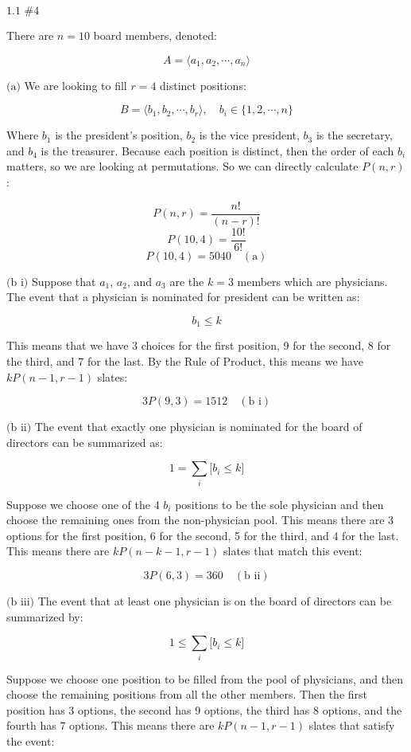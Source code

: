 \documentclass{article}
\newcommand{\problem}[2]{$\boxed{\text{#1 \##2}}$}
\newcommand{\subproblem}[1]{$\boxed{\text{(#1)}}$}
\newcommand{\subsolution}[2]{\boxed{#2\quad(\text{#1})}}
\newcommand{\ROP}{Rule of Product}
\begin{document}
\begin{multicols*}{2}

%
\problem{1.1}{4}

There are $n=10$ board members, denoted:

\[
A=\langle{}a_1,a_2,\cdots,a_n\rangle
\]

%
\subproblem{a} We are looking to fill $r=4$ distinct positions:

\[
B=\langle{}b_1,b_2,\cdots,b_r\rangle, \quad b_i\in\{1,2,\cdots,n\}
\]

Where $b_1$ is the president's position, $b_2$ is the vice president,
$b_3$ is the secretary, and $b_4$ is the treasurer. Because each
position is distinct, then the order of each $b_i$ matters, so we are
looking at permutations. So we can directly calculate $P(n,r)$:

\[
P(n,r)=\frac{n!}{(n-r)!}
\] \[
P(10, 4)=\frac{10!}{6!}
\] \[
\subsolution{a}{P(10, 4)=5040}
\]

%
\subproblem{b i} Suppose that $a_1$, $a_2$, and $a_3$ are the $k=3$
members which are physicians. The event that a physician is nominated
for president can be written as:

\[
b_1\le k
\]

This means that we have 3 choices for the first position, 9 for the
second, 8 for the third, and 7 for the last. By the \ROP, this means
we have $kP(n-1,r-1)$ slates:

\[
\subsolution{b i}{3P(9,3)=1512}
\]

%
\subproblem{b ii} The event that exactly one physician is nominated
for the board of directors can be summarized as:

\[
1=\sum\limits_i \lbrack b_i\le k\rbrack
\]

Suppose we choose one of the 4 $b_i$ positions to be the sole
physician and then choose the remaining ones from the non-physician
pool. This means there are 3 options for the first position, 6 for the
second, 5 for the third, and 4 for the last. This means there are
$kP(n-k-1,r-1)$ slates that match this event:

\[
\subsolution{b ii}{3P(6,3)=360}
\]

%
\subproblem{b iii} The event that at least one physician is on the
board of directors can be summarized by:

\[
1\le \sum\limits_i \lbrack b_i\le k\rbrack
\]

Suppose we choose one position to be filled from the pool of
physicians, and then choose the remaining positions from all the other
members. Then the first position has 3 options, the second has 9
options, the third has 8 options, and the fourth has 7 options. This
means there are $kP(n-1,r-1)$ slates that satisfy the event:


\end{multicols*}
\end{document}
